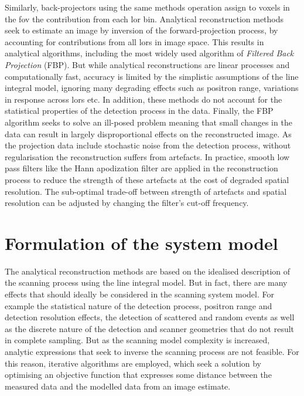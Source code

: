 Similarly, back-projectors using the same methods operation assign to voxels in the \gls{fov} the contribution from each \gls{lor} bin.
Analytical reconstruction methods seek to estimate an image by inversion of the forward-projection process, by accounting for contributions from all \glspl{lor} in image space. 
This results in analytical algorithms, including the most widely used algorithm of \textit{Filtered Back Projection} (FBP).
But while analytical reconstructions are linear processes and computationally fast, accuracy is limited by the simplistic assumptions of the line integral model, ignoring many degrading effects such as positron range, variations in response across \glspl{lor} etc. In addition, these methods do not account for the statistical properties of the detection process in the data.
Finally, the FBP algorithm seeks to solve an ill-posed problem meaning that small changes in the data can result in largely disproportional effects on the reconstructed image. As the projection data include stochastic noise from the detection process, without regularisation the reconstruction suffers from artefacts. In practice, smooth low pass filters like the Hann apodization filter are applied in the reconstruction process to reduce the strength of these artefacts at the cost of degraded spatial resolution. The sub-optimal trade-off between strength of artefacts and spatial resolution can be adjusted by changing the filter's cut-off frequency.

\section{Formulation of the system model}
The analytical reconstruction methods are based on the idealised description of the scanning process using the line integral model. But in fact, there are many effects that should ideally be considered in the scanning system model. For example the statistical nature of the detection process, positron range and detection resolution effects, the detection of scattered and random events as well as the discrete nature of the detection and scanner geometries that do not result in complete sampling.
But as the scanning model complexity is increased, analytic expressions that seek to inverse the scanning process are not feasible.
For this reason, iterative algorithms are employed, which seek a solution by optimising an objective function that expresses some distance between the measured data and the modelled data from an image estimate.

